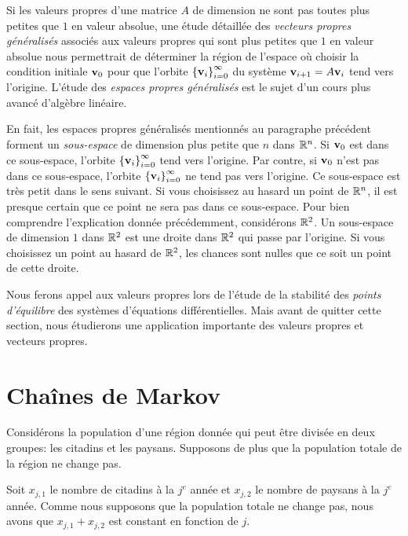 {\begin{rmk}[\theory]
Si les valeurs propres d'une matrice $A$ de dimension \nn ne sont pas
toutes plus petites que $1$ en valeur absolue, une étude détaillée des
{\em vecteurs propres généralisés} associés aux valeurs propres qui
sont plus petites que $1$ en valeur absolue nous permettrait de
déterminer la région de l'espace où choisir la condition initiale
$\mathbf{v}_0$ pour que l'orbite
$\displaystyle \left\{ \mathbf{v}_i\right\}_{i=0}^\infty$ du système 
$\mathbf{v}_{i+1} = A\mathbf{v}_i$ tend vers l'origine.  L'étude des
{\em espaces propres généralisés}
est le sujet d'un cours plus avancé d'algèbre linéaire. 

En fait, les espaces propres généralisés mentionnés au paragraphe
précédent forment un {\em sous-espace} de dimension plus petite que $n$
dans $\mathbb{R}^n$.  Si $\mathbf{v}_0$ est dans ce sous-espace, l'orbite
$\displaystyle \left\{ \mathbf{v}_i \right\}_{i=0}^\infty$ tend vers 
l'origine.  Par contre, si $\mathbf{v}_0$ n'est pas dans ce sous-espace,
l'orbite $\displaystyle \left\{ \mathbf{v}_i \right\}_{i=0}^\infty$ ne
tend pas vers l'origine.  Ce sous-espace est très petit dans le sens
suivant.  Si vous choisissez au hasard un point de $\mathbb{R}^n$, il est
presque certain que ce point ne sera pas dans ce sous-espace.  Pour
bien comprendre l'explication donnée précédemment, considérons
$\mathbb{R}^2$.  Un sous-espace de dimension $1$ dans $\mathbb{R}^2$ est une droite
dans $\mathbb{R}^2$ qui passe par l'origine.  Si vous choisissez un point au
hasard de $\mathbb{R}^2$, les chances sont nulles que ce soit un point de
cette droite.
\end{rmk}

Nous ferons appel aux valeurs propres lors de l'étude de la stabilité
des {\em points d'équilibre} des systèmes d'équations différentielles.
Mais avant de quitter cette section, nous étudierons une application
importante des valeurs propres et vecteurs propres.

\section{Chaînes de Markov \eco}\label{sectChainseMarkov}

\begin{egg}
Considérons la population d'une région donnée qui peut être divisée
en deux groupes: les citadins et les paysans.  Supposons de plus que la
population totale de la région ne change pas.

Soit $x_{j,1}$ le nombre de citadins à la $j^e$ année et $x_{j,2}$ le nombre
de paysans à la $j^e$ année.  Comme nous supposons que la population
totale ne change pas, nous avons que $x_{j,1} + x_{j,2}$ est constant en
fonction de $j$.


\end{egg}}
